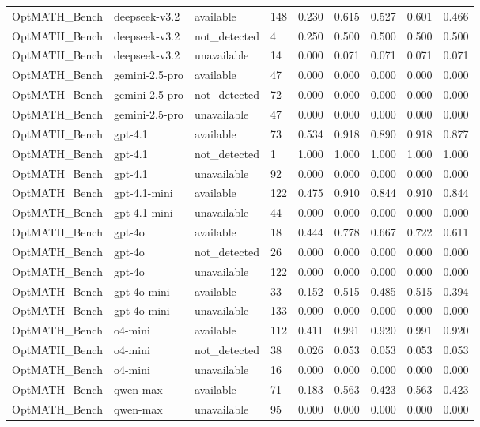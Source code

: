 \begin{table}[t]
\begin{tabular}{lllllllll}
OptMATH\_Bench & deepseek-v3.2 & available & 148 & 0.230 & 0.615 & 0.527 & 0.601 & 0.466 \\
OptMATH\_Bench & deepseek-v3.2 & not\_detected & 4 & 0.250 & 0.500 & 0.500 & 0.500 & 0.500 \\
OptMATH\_Bench & deepseek-v3.2 & unavailable & 14 & 0.000 & 0.071 & 0.071 & 0.071 & 0.071 \\
OptMATH\_Bench & gemini-2.5-pro & available & 47 & 0.000 & 0.000 & 0.000 & 0.000 & 0.000 \\
OptMATH\_Bench & gemini-2.5-pro & not\_detected & 72 & 0.000 & 0.000 & 0.000 & 0.000 & 0.000 \\
OptMATH\_Bench & gemini-2.5-pro & unavailable & 47 & 0.000 & 0.000 & 0.000 & 0.000 & 0.000 \\
OptMATH\_Bench & gpt-4.1 & available & 73 & 0.534 & 0.918 & 0.890 & 0.918 & 0.877 \\
OptMATH\_Bench & gpt-4.1 & not\_detected & 1 & 1.000 & 1.000 & 1.000 & 1.000 & 1.000 \\
OptMATH\_Bench & gpt-4.1 & unavailable & 92 & 0.000 & 0.000 & 0.000 & 0.000 & 0.000 \\
OptMATH\_Bench & gpt-4.1-mini & available & 122 & 0.475 & 0.910 & 0.844 & 0.910 & 0.844 \\
OptMATH\_Bench & gpt-4.1-mini & unavailable & 44 & 0.000 & 0.000 & 0.000 & 0.000 & 0.000 \\
OptMATH\_Bench & gpt-4o & available & 18 & 0.444 & 0.778 & 0.667 & 0.722 & 0.611 \\
OptMATH\_Bench & gpt-4o & not\_detected & 26 & 0.000 & 0.000 & 0.000 & 0.000 & 0.000 \\
OptMATH\_Bench & gpt-4o & unavailable & 122 & 0.000 & 0.000 & 0.000 & 0.000 & 0.000 \\
OptMATH\_Bench & gpt-4o-mini & available & 33 & 0.152 & 0.515 & 0.485 & 0.515 & 0.394 \\
OptMATH\_Bench & gpt-4o-mini & unavailable & 133 & 0.000 & 0.000 & 0.000 & 0.000 & 0.000 \\
OptMATH\_Bench & o4-mini & available & 112 & 0.411 & 0.991 & 0.920 & 0.991 & 0.920 \\
OptMATH\_Bench & o4-mini & not\_detected & 38 & 0.026 & 0.053 & 0.053 & 0.053 & 0.053 \\
OptMATH\_Bench & o4-mini & unavailable & 16 & 0.000 & 0.000 & 0.000 & 0.000 & 0.000 \\
OptMATH\_Bench & qwen-max & available & 71 & 0.183 & 0.563 & 0.423 & 0.563 & 0.423 \\
OptMATH\_Bench & qwen-max & unavailable & 95 & 0.000 & 0.000 & 0.000 & 0.000 & 0.000 \\

\end{tabular}
\end{table}
